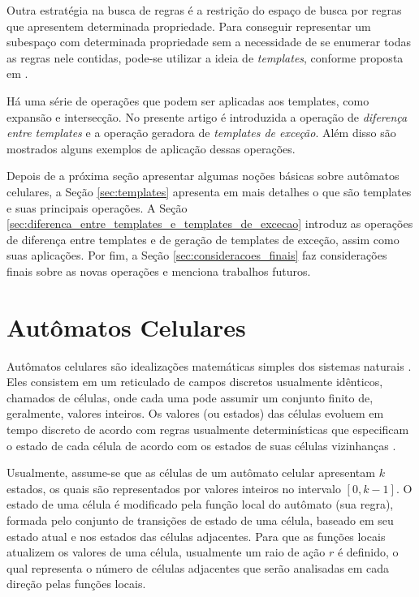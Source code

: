 \documentclass[12pt, a4paper]{article}
\begin{document}
Outra estratégia na busca de regras é a restrição do espaço de busca por regras que apresentem determinada propriedade. Para conseguir representar um subespaço com determinada propriedade sem a necessidade de se enumerar todas as regras nele contidas, pode-se utilizar a ideia de \textit{templates}, conforme proposta em \cite{deOliveira2014,deOliveira2014b}.

Há uma série de operações que podem ser aplicadas aos templates, como expansão e intersecção. No presente artigo é introduzida a operação de \textit{diferença entre templates} e a operação geradora de \textit{templates de exceção}. Além disso são mostrados alguns exemplos de aplicação dessas operações.

Depois de a próxima seção apresentar algumas noções básicas sobre autômatos celulares, a Seção \ref{sec:templates}
 apresenta em mais detalhes o que são templates e suas principais operações. A Seção \ref{sec:diferenca_entre_templates_e_templates_de_excecao}
 introduz as operações de diferença entre templates e de geração de templates de exceção, assim como suas aplicações. Por fim, a Seção \ref{sec:consideracoes_finais} faz considerações finais sobre as novas operações e menciona trabalhos futuros.

\section{Autômatos Celulares}
\label{sec:automatos_celulares}
Autômatos celulares são idealizações matemáticas simples dos sistemas naturais \cite{wolfram1994cellular}. Eles consistem em um reticulado de campos discretos usualmente idênticos, chamados de células, onde cada uma pode assumir um conjunto finito de, geralmente, valores inteiros. Os valores (ou estados) das células evoluem em tempo discreto de acordo com regras usualmente determinísticas que especificam o estado de cada célula de acordo com os estados de suas células vizinhanças \cite{wolfram1994cellular}.

Usualmente, assume-se que as células de um autômato celular apresentam $k$ estados, os quais são representados por valores inteiros no intervalo $[0, k-1]$. O estado de uma célula é modificado pela função local do autômato (sua regra), formada pelo conjunto de transições de estado de uma célula, baseado em seu estado atual e nos estados das células adjacentes. Para que as funções locais atualizem os valores de uma célula, usualmente um raio de ação $r$ é definido, o qual representa o número de células adjacentes que serão analisadas em cada direção pelas funções locais.
\end{document}
